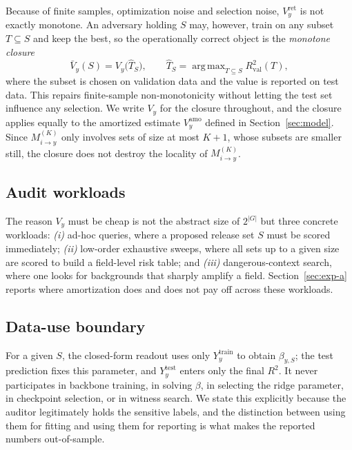 \documentclass[preprint,12pt]{elsarticle}
\newcommand{\Vy}{V_{y}}
\newcommand{\Mik}{M^{(K)}_{i \to y}}
\newcommand{\Rtwo}{R^{2}}
\DeclareMathOperator*{\argmax}{arg\,max}
\begin{document}
Because of finite samples, optimization noise and selection noise, $\Vy^{\mathrm{ret}}$ is
not exactly monotone. An adversary holding $S$ may, however, train on any subset
$T \subseteq S$ and keep the best, so the operationally correct object is the
\emph{monotone closure}
\begin{equation}\label{eq:closure}
\bar V_y(S) = \Vy\big(\hat T_S\big), \qquad
\hat T_S = \argmax_{T \subseteq S} \Rtwo_{\mathrm{val}}(T),
\end{equation}
where the subset is chosen on validation data and the value is reported on test data.
This repairs finite-sample non-monotonicity without letting the test set influence any
selection. We write $\Vy$ for the closure throughout, and the closure applies equally to
the amortized estimate $\Vy^{\mathrm{amo}}$ defined in Section~\ref{sec:model}.
Since $\Mik$ only involves sets of size at most $K+1$, whose subsets are smaller still,
the closure does not destroy the locality of $\Mik$.

\subsection{Audit workloads}
The reason $\Vy$ must be cheap is not the abstract size of $2^{|G|}$ but three concrete
workloads: \emph{(i)} ad-hoc queries, where a proposed release set $S$ must be scored
immediately; \emph{(ii)} low-order exhaustive sweeps, where all sets up to a given size are
scored to build a field-level risk table; and \emph{(iii)} dangerous-context search, where
one looks for backgrounds that sharply amplify a field. Section~\ref{sec:exp-a} reports
where amortization does and does not pay off across these workloads.

\subsection{Data-use boundary}
For a given $S$, the closed-form readout uses only $Y_y^{\mathrm{train}}$ to obtain
$\beta_{y,S}$; the test prediction fixes this parameter, and $Y_y^{\mathrm{test}}$ enters
only the final $\Rtwo$. It never participates in backbone training, in solving $\beta$, in
selecting the ridge parameter, in checkpoint selection, or in witness search. We state this
explicitly because the auditor legitimately holds the sensitive labels, and the distinction
between using them for fitting and using them for reporting is what makes the reported
numbers out-of-sample.

\end{document}
